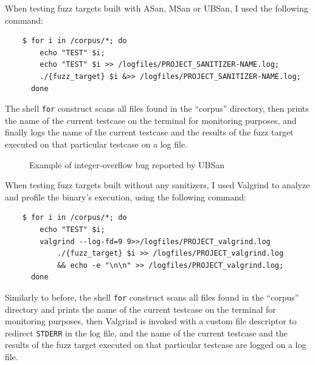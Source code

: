 \newpage
When testing fuzz targets built with ASan, MSan or UBSan, I used the following command:
\begin{verbatim}
    $ for i in /corpus/*; do 
        echo "TEST" $i; 
        echo "TEST" $i >> /logfiles/PROJECT_SANITIZER-NAME.log; 
        ./{fuzz_target} $i &>> /logfiles/PROJECT_SANITIZER-NAME.log; 
      done
\end{verbatim}
The shell \verb|for| construct scans all files found in the ``corpus'' directory, then prints the name of the current testcase on the terminal for monitoring purposes, and finally logs the name of the current testcase and the results of the fuzz target executed on that particular testcase on a log file.

\begin{figure}[h]
\caption{Example of integer-overflow bug reported by UBSan}
\label{fig:ubsan_example}
\end{figure}


\newpage
When testing fuzz targets built without any sanitizers, I used Valgrind to analyze and profile the binary's execution, using the following command:
\begin{verbatim}
    $ for i in /corpus/*; do 
        echo "TEST" $i; 
        valgrind --log-fd=9 9>>/logfiles/PROJECT_valgrind.log 
            ./{fuzz_target} $i >> /logfiles/PROJECT_valgrind.log 
            && echo -e "\n\n" >> /logfiles/PROJECT_valgrind.log; 
      done
\end{verbatim}
Similarly to before, the shell \verb|for| construct scans all files found in the ``corpus'' directory and prints the name of the current testcase on the terminal for monitoring purposes, then Valgrind is invoked with a custom file descriptor to redirect \verb|STDERR| in the log file, and the name of the current testcase and the results of the fuzz target executed on that particular testcase are logged on a log file.

